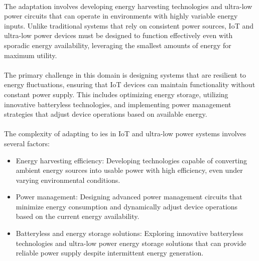     \paragraph{}
    The adaptation involves developing energy harvesting technologies and ultra-low power circuits that can operate in environments with highly variable energy inputs. Unlike traditional systems that rely on consistent power sources, IoT and ultra-low power devices must be designed to function effectively even with sporadic energy availability, leveraging the smallest amounts of energy for maximum utility\cite{EHandEE}.

    \paragraph{}
    The primary challenge in this domain is designing systems that are resilient to energy fluctuations, ensuring that IoT devices can maintain functionality without constant power supply. This includes optimizing energy storage, utilizing innovative batteryless technologies, and implementing power management strategies that adjust device operations based on available energy.

    \paragraph{}
    The complexity of adapting to \gls{ies} in IoT and ultra-low power systems involves several factors:
    \begin{itemize}
        \item Energy harvesting efficiency: Developing technologies capable of converting ambient energy sources into usable power with high efficiency, even under varying environmental conditions.
        \item Power management: Designing advanced power management circuits that minimize energy consumption and dynamically adjust device operations based on the current energy availability.
        \item Batteryless and energy storage solutions: Exploring innovative batteryless technologies and ultra-low power energy storage solutions that can provide reliable power supply despite intermittent energy generation.
    \end{itemize}

